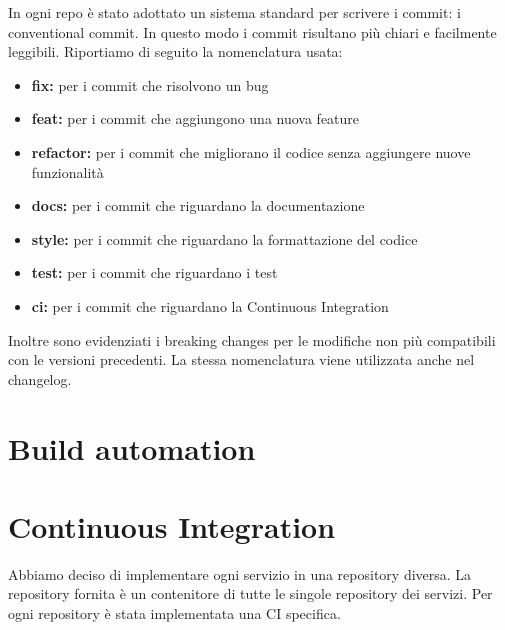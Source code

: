In ogni repo è stato adottato un sistema standard per scrivere i commit:  i conventional commit. In questo modo i commit risultano più chiari e facilmente leggibili. 
Riportiamo di seguito la nomenclatura usata:
\begin{itemize}
    \item \textbf{fix:} per i commit che risolvono un bug
    \item \textbf{feat:} per i commit che aggiungono una nuova feature
    \item \textbf{refactor:} per i commit che migliorano il codice senza aggiungere nuove funzionalità
    \item \textbf{docs:} per i commit che riguardano la documentazione
    \item \textbf{style:} per i commit che riguardano la formattazione del codice
    \item \textbf{test:} per i commit che riguardano i test
    \item \textbf{ci:} per i commit che riguardano la Continuous Integration
\end{itemize}
Inoltre sono evidenziati i breaking changes per le modifiche non più compatibili con le versioni precedenti.
La stessa nomenclatura viene utilizzata anche nel changelog.

\section{Build automation}
\section{Continuous Integration}
Abbiamo deciso di implementare ogni servizio in una repository diversa. La repository fornita è un contenitore di tutte le singole repository dei servizi.
Per ogni repository è stata implementata una CI specifica. \\

